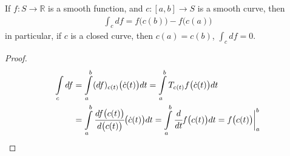 \documentclass[10pt]{article}
\begin{document}
        \begin{theorem}
            If $f: S\rightarrow\mathbb{R}$ is a smooth function, and $c: [a,b]\rightarrow S$ is a smooth curve, then
            \begin{equation*}
                \begin{aligned}
                    \int_{c}df = f\big(c(b)\big) - f\big(c(a)\big)
                \end{aligned}
            \end{equation*}
            in particular, if $c$ is a closed curve, then $c(a) = c(b)$,  $\int_{c}df = 0$.
        \end{theorem}
        \begin{proof}
            \begin{equation*}
                \begin{aligned}
                    \int\limits_{c}df &= \int\limits_{a}^{b}(df)_{c(t)}\big(\dot{c}(t)\big)dt = \int\limits_{a}^{b} T_{c(t)}f\big(\dot{c}(t)\big)dt \\ 
                    &= \int\limits_{a}^{b}\cfrac{df\big(c(t)\big)}{d\big(c(t)\big)}\big(\dot{c}(t)\big)dt = \int\limits_{a}^{b}\cfrac{d}{dt}f\big(c(t)\big)dt = f\big(c(t)\big)\bigg|_a^b
                \end{aligned}
            \end{equation*}
        \end{proof}













        \newpage
\end{document}
